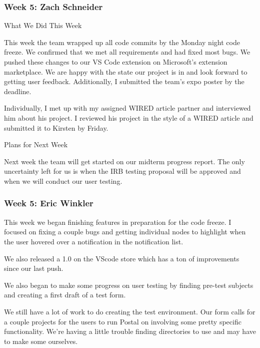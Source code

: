  \subsubsection{Week 5: Zach Schneider}

What We Did This Week

This week the team wrapped up all code commits by the Monday night code freeze. We confirmed that we met all requirements and had fixed most bugs. We pushed these changes to our VS Code extension on Microsoft's extension marketplace. We are happy with the state our project is in and look forward to getting user feedback. Additionally, I submitted the team's expo poster by the deadline. 



Individually, I met up with my assigned WIRED article partner and interviewed him about his project. I reviewed his project in the style of a WIRED article and submitted it to Kirsten by Friday. 



Plans for Next Week

Next week the team will get started on our midterm progress report. The only uncertainty left for us is when the IRB testing proposal will be approved and when we will conduct our user testing. \\ 

 \subsubsection{Week 5: Eric Winkler}

This week we began finishing features in preparation for the code freeze. I focused on fixing a couple bugs and getting individual nodes to highlight when the user hovered over a notification in the notification list. 



We also released a 1.0 on the VScode store which has a ton of improvements since our last push. 



We also began to make some progress on user testing by finding pre-test subjects and creating a first draft of a test form.



We still have a lot of work to do creating the test environment. Our form calls for a couple projects for the users to run Postal on involving some pretty specific functionality. We're having a little trouble finding directories to use and may have to make some ourselves.



